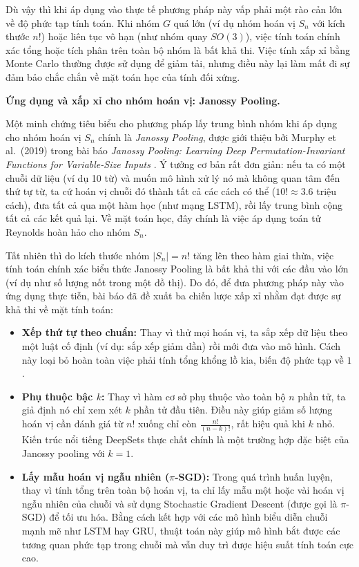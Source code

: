 Dù vậy thì khi áp dụng vào thực tế phương pháp này vấp phải một rào cản lớn về độ phức tạp tính toán. Khi nhóm $G$ quá lớn (ví dụ nhóm hoán vị $S_n$ với kích thước $n!$) hoặc liên tục vô hạn (như nhóm quay $SO(3)$), việc tính toán chính xác tổng hoặc tích phân trên toàn bộ nhóm là bất khả thi. Việc tính xấp xỉ bằng Monte Carlo thường được sử dụng để giảm tải, nhưng điều này lại làm mất đi sự đảm bảo chắc chắn về mặt toán học của tính đối xứng.

\vspace{0.5em}
\textbf{Ứng dụng và xấp xỉ cho nhóm hoán vị: Janossy Pooling.}

Một minh chứng tiêu biểu cho phương pháp lấy trung bình nhóm khi áp dụng cho nhóm hoán vị $S_n$ chính là \textit{Janossy Pooling}, được giới thiệu bởi Murphy et al.\ (2019) trong bài báo \textit{Janossy Pooling: Learning Deep Permutation-Invariant Functions for Variable-Size Inputs} \cite{murphy2019janossy}. Ý tưởng cơ bản rất đơn giản: nếu ta có một chuỗi dữ liệu (ví dụ 10 từ) và muốn mô hình xử lý nó mà không quan tâm đến thứ tự từ, ta cứ hoán vị chuỗi đó thành tất cả các cách có thể ($10! \approx 3.6$ triệu cách), đưa tất cả qua một hàm học (như mạng LSTM), rồi lấy trung bình cộng tất cả các kết quả lại. Về mặt toán học, đây chính là việc áp dụng toán tử Reynolds hoàn hảo cho nhóm $S_n$.

Tất nhiên thì do kích thước nhóm $|S_n| = n!$ tăng lên theo hàm giai thừa, việc tính toán chính xác biểu thức Janossy Pooling là bất khả thi với các đầu vào lớn (ví dụ như số lượng nốt trong một đồ thị). Do đó, để đưa phương pháp này vào ứng dụng thực tiễn, bài báo đã đề xuất ba chiến lược xấp xỉ nhằm đạt được sự khả thi về mặt tính toán:
\begin{itemize}
    \item \textbf{Xếp thứ tự theo chuẩn:} Thay vì thử mọi hoán vị, ta sắp xếp dữ liệu theo một luật cố định (ví dụ: sắp xếp giảm dần) rồi mới đưa vào mô hình. Cách này loại bỏ hoàn toàn việc phải tính tổng khổng lồ kia, biến độ phức tạp về $1$.
    \item \textbf{Phụ thuộc bậc $k$:} Thay vì hàm cơ sở phụ thuộc vào toàn bộ $n$ phần tử, ta giả định nó chỉ xem xét $k$ phần tử đầu tiên. Điều này giúp giảm số lượng hoán vị cần đánh giá từ $n!$ xuống chỉ còn $\frac{n!}{(n-k)!}$, rất hiệu quả khi $k$ nhỏ. Kiến trúc nổi tiếng DeepSets \cite{zaheer2017deep} thực chất chính là một trường hợp đặc biệt của Janossy pooling với $k=1$.
    \item \textbf{Lấy mẫu hoán vị ngẫu nhiên ($\pi$-SGD):} Trong quá trình huấn luyện, thay vì tính tổng trên toàn bộ hoán vị, ta chỉ lấy mẫu một hoặc vài hoán vị ngẫu nhiên của chuỗi và sử dụng Stochastic Gradient Descent (được gọi là $\pi$-SGD) để tối ưu hóa. Bằng cách kết hợp với các mô hình biểu diễn chuỗi mạnh mẽ như LSTM hay GRU, thuật toán này giúp mô hình bắt được các tương quan phức tạp trong chuỗi mà vẫn duy trì được hiệu suất tính toán cực cao.
\end{itemize}

